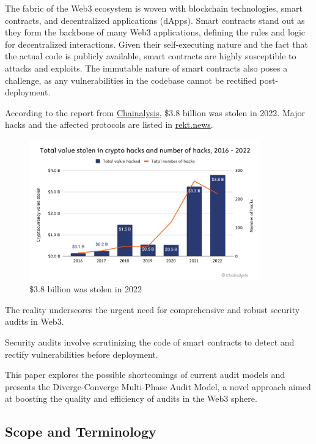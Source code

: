 \documentclass[10pt]{extarticle}
\begin{document}
The fabric of the Web3 ecosystem is woven with blockchain technologies,
smart contracts, and decentralized applications (dApps). Smart contracts
stand out as they form the backbone of many Web3 applications, defining
the rules and logic for decentralized interactions. Given their
self-executing nature and the fact that the actual code is publicly
available, smart contracts are highly susceptible to attacks and
exploits. The immutable nature of smart contracts also poses a
challenge, as any vulnerabilities in the codebase cannot be rectified
post-deployment.

According to the report from
\href{https://www.chainalysis.com/blog/2022-biggest-year-ever-for-crypto-hacking/}{Chainalysis},
\$3.8 billion was stolen in 2022. Major hacks and the affected protocols
are listed in \href{https://rekt.news/leaderboard/}{rekt.news}.

\begin{figure}[htp]
  \centering
  \includegraphics[width=10cm]{img/chart-hack-totals.png}
  \caption{\$3.8 billion was stolen in 2022}
  \label{fig:galaxy}
\end{figure}

The reality underscores the urgent need for comprehensive and robust
security audits in Web3.

Security audits involve scrutinizing the code of smart contracts to
detect and rectify vulnerabilities before deployment.

This paper explores the possible shortcomings of current audit models
and presents the Diverge-Converge Multi-Phase Audit Model, a novel
approach aimed at boosting the quality and efficiency of audits in the
Web3 sphere.

\subsection{Scope and Terminology}\label{12-scope-and-terminology}
\end{document}
